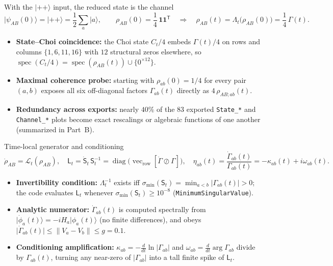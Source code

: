 \documentclass[aspectratio=169,11pt]{beamer}
\newcommand{\ket}[1]{\lvert #1\rangle}
\newcommand{\diag}{\operatorname{diag}}
\newcommand{\spec}{\operatorname{spec}}
\newcommand{\St}{\mathsf S_t}
\newcommand{\Lt}{\mathsf L_t}
\begin{document}
\begin{frame}{With the $\ket{++}$ input, the reduced state is the channel}
\small
\[
\ket{\psi_{AB}(0)}=\ket{++}=\frac12\sum_a\ket a,\qquad
\rho_{AB}(0)=\frac14\,\mathbf1\mathbf1^{\mathsf T}
\quad\Longrightarrow\quad
\boxed{\rho_{AB}(t)=\Lambda_t\bigl(\rho_{AB}(0)\bigr)=\frac14\,\Gamma(t).}
\]
\begin{itemize}\setlength\itemsep{5pt}
\item \textbf{State--Choi coincidence:} the Choi state $C_t/4$ embeds $\Gamma(t)/4$ on rows and columns $\{1,6,11,16\}$ with $12$ structural zeros elsewhere, so $\spec(C_t/4)=\spec(\rho_{AB}(t))\cup\{0^{\times 12}\}$.
\item \textbf{Maximal coherence probe:} starting with $\rho_{ab}(0)=1/4$ for every pair $(a,b)$ exposes all six off-diagonal factors $\Gamma_{ab}(t)$ directly as $4\,\rho_{AB;ab}(t)$.
\item \textbf{Redundancy across exports:} nearly $40\%$ of the $83$ exported \texttt{State\_*} and \texttt{Channel\_*} plots become exact rescalings or algebraic functions of one another (summarized in Part~B).
\end{itemize}
\end{frame}

\begin{frame}{Time-local generator and conditioning}
\small
\[
\dot\rho_{AB}=\mathcal L_t(\rho_{AB}),\quad
\Lt = \dot{\mathsf S}_t\,\St^{-1} = \diag\bigl(\operatorname{vec}_{\mathrm{row}}[\dot\Gamma\oslash\Gamma]\bigr),\quad
\eta_{ab}(t)=\frac{\dot\Gamma_{ab}(t)}{\Gamma_{ab}(t)}=-\kappa_{ab}(t)+i\omega_{ab}(t).
\]
\begin{itemize}\setlength\itemsep{5pt}
\item \textbf{Invertibility condition:} $\Lambda_t^{-1}$ exists iff $\sigma_{\min}(\St)=\min_{a<b}\lvert\Gamma_{ab}(t)\rvert>0$; the code evaluates $\Lt$ whenever $\sigma_{\min}(\St)\ge 10^{-8}$ (\texttt{MinimumSingularValue}).
\item \textbf{Analytic numerator:} $\dot\Gamma_{ab}(t)$ is computed spectrally from $\ket{\dot\phi_a(t)}=-iH_a\ket{\phi_a(t)}$ (no finite differences), and obeys $\lvert\dot\Gamma_{ab}(t)\rvert\le\lVert V_a-V_b\rVert\le g = 0.1$.
\item \textbf{Conditioning amplification:} $\kappa_{ab}=-\tfrac{d}{dt}\ln\lvert\Gamma_{ab}\rvert$ and $\omega_{ab}=\tfrac{d}{dt}\arg\Gamma_{ab}$ divide by $\Gamma_{ab}(t)$, turning any near-zero of $\lvert\Gamma_{ab}\rvert$ into a tall finite spike of $\Lt$.
\end{itemize}
\end{frame}
\end{document}
